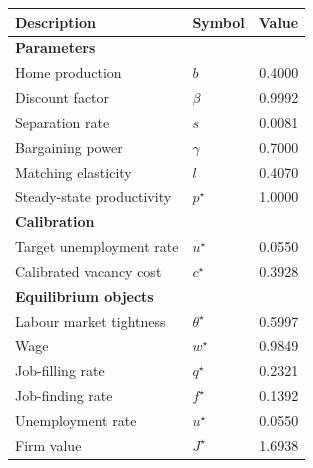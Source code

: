 \begin{tabular}{llr}
\toprule
\textbf{Description} & \textbf{Symbol} & \textbf{Value} \\
\midrule
\multicolumn{3}{l}{\textbf{Parameters}} \\
Home production            & $b$       &   0.4000 \\
Discount factor            & $\beta$  &   0.9992 \\
Separation rate            & $s$       &   0.0081 \\
Bargaining power           & $\gamma$ &   0.7000 \\
Matching elasticity        & $l$       &   0.4070 \\
Steady-state productivity  & $p^\star$ &   1.0000 \\
\midrule
\multicolumn{3}{l}{\textbf{Calibration}} \\
Target unemployment rate   & $u^\star$ &   0.0550 \\
Calibrated vacancy cost    & $c^\star$ &   0.3928 \\
\midrule
\multicolumn{3}{l}{\textbf{Equilibrium objects}} \\
Labour market tightness    & $\theta^\star$ &   0.5997 \\
Wage                       & $w^\star$       &   0.9849 \\
Job-filling rate           & $q^\star$       &   0.2321 \\
Job-finding rate           & $f^\star$       &   0.1392 \\
Unemployment rate          & $u^\star$       &   0.0550 \\
Firm value                 & $J^\star$       &   1.6938 \\
\bottomrule
\end{tabular}
